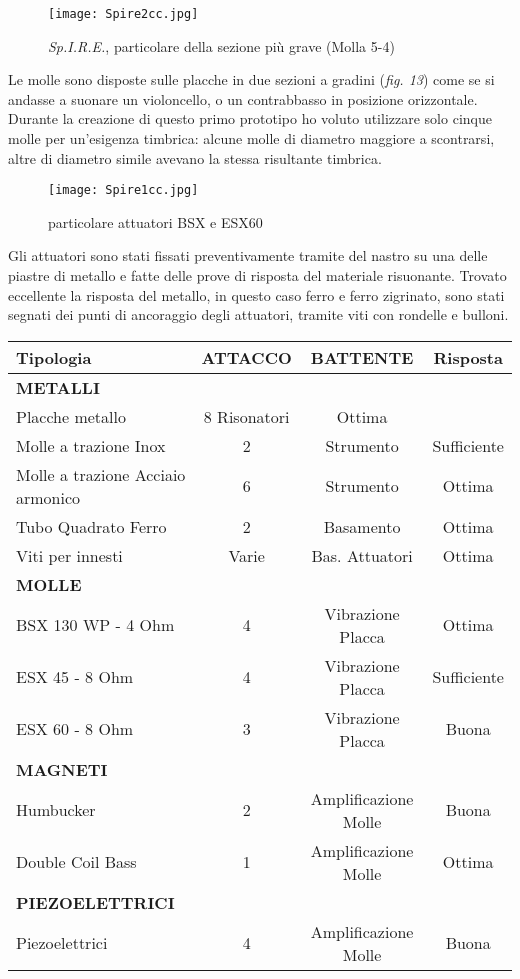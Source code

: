 \begin{figure}[htbp]
\begin{center}
\texttt{[image: Spire2cc.jpg]}
\caption{\textit{Sp.I.R.E.}, particolare della sezione più grave (Molla 5-4)}
\label{default}
\end{center}
\end{figure}

Le molle sono disposte sulle placche in due sezioni a gradini (\textit{fig. 13}) come se si andasse a suonare un violoncello, o un contrabbasso in posizione orizzontale. Durante la creazione di questo primo prototipo ho voluto utilizzare solo cinque molle per un'esigenza timbrica: alcune molle di diametro maggiore a scontrarsi, altre di diametro simile avevano la stessa risultante timbrica. 

\begin{figure}[t]
\begin{center}
\texttt{[image: Spire1cc.jpg]}
\caption{particolare attuatori BSX e ESX60}
\label{default}
\end{center}
\end{figure}

Gli attuatori sono stati fissati preventivamente tramite del nastro su una delle piastre di metallo e fatte delle prove di risposta del materiale risuonante. Trovato eccellente la risposta del metallo, in questo caso ferro e ferro zigrinato, sono stati segnati dei punti di ancoraggio degli attuatori, tramite viti con rondelle e bulloni.

\clearpage 

\begin{tabularx}{\textwidth}{Xccc}
\toprule
\textbf{Tipologia} & \textbf{ATTACCO} & \textbf{BATTENTE} & \textbf{Risposta} \\
\midrule \textbf{METALLI} & & & \\
\midrule 
Placche metallo & 8 Risonatori & Ottima \\
\midrule 
Molle a trazione Inox & 2 & Strumento & Sufficiente \\
\midrule 
Molle a trazione Acciaio armonico & 6 & Strumento & Ottima\\
\midrule 
Tubo Quadrato Ferro & 2 & Basamento & Ottima\\
\midrule 
Viti per innesti & Varie & Bas. Attuatori & Ottima\\
\midrule 
\textbf{MOLLE}\\
\midrule 
BSX 130 WP - 4 Ohm & 4 & Vibrazione Placca & Ottima\\
\midrule 
ESX 45 - 8 Ohm & 4 & Vibrazione Placca & Sufficiente\\
\midrule 
ESX 60 - 8 Ohm & 3 & Vibrazione Placca & Buona\\
\midrule 
\textbf{MAGNETI}\\
\midrule 
Humbucker & 2 & Amplificazione Molle & Buona\\
\midrule 
Double Coil Bass & 1 & Amplificazione Molle & Ottima\\
\midrule 
\textbf{PIEZOELETTRICI} \\
\midrule 
Piezoelettrici & 4 & Amplificazione Molle & Buona\\
\bottomrule
\end{tabularx}

